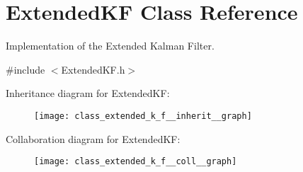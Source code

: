 \hypertarget{class_extended_k_f}{\section{\-Extended\-K\-F \-Class \-Reference}
\label{class_extended_k_f}
}


\-Implementation of the \-Extended \-Kalman \-Filter.  




{\ttfamily \#include $<$\-Extended\-K\-F.\-h$>$}



\-Inheritance diagram for \-Extended\-K\-F\-:\nopagebreak
\begin{figure}[H]
\begin{center}
\leavevmode
\texttt{[image: class\_extended\_k\_f\_\_inherit\_\_graph]}
\end{center}
\end{figure}


\-Collaboration diagram for \-Extended\-K\-F\-:\nopagebreak
\begin{figure}[H]
\begin{center}
\leavevmode
\texttt{[image: class\_extended\_k\_f\_\_coll\_\_graph]}
\end{center}
\end{figure}

